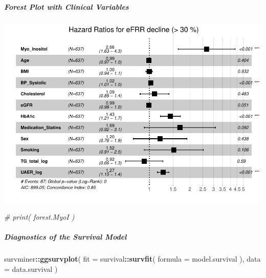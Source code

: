 \documentclass[]{article}
\newenvironment{Shaded}{\begin{snugshade}}{\end{snugshade}}
\newcommand{\CommentTok}[1]{\textcolor[rgb]{0.56,0.35,0.01}{\textit{#1}}}
\newcommand{\DataTypeTok}[1]{\textcolor[rgb]{0.13,0.29,0.53}{#1}}
\newcommand{\KeywordTok}[1]{\textcolor[rgb]{0.13,0.29,0.53}{\textbf{#1}}}
\newcommand{\NormalTok}[1]{#1}
\newcommand{\OperatorTok}[1]{\textcolor[rgb]{0.81,0.36,0.00}{\textbf{#1}}}
\newcommand{\StringTok}[1]{\textcolor[rgb]{0.31,0.60,0.02}{#1}}
\let\oldsubparagraph\subparagraph
\renewcommand{\subparagraph}[1]{\oldsubparagraph{#1}\mbox{}}
\begin{document}
\newpage

\hypertarget{forest-plot-with-clinical-variables-2}{%
\subparagraph{Forest Plot with Clinical
Variables}\label{forest-plot-with-clinical-variables-2}}

\begin{Shaded}
\end{Shaded}

\includegraphics{0033_PROFIL--Metabolomics_files/figure-latex/Myo-I-Mortality-Adjusted-Forest-1.pdf}

\begin{Shaded}
\begin{Highlighting}[]
\CommentTok{# print( forest.MyoI )}
\end{Highlighting}
\end{Shaded}

\newpage

\hypertarget{diagnostics-of-the-survival-model-2}{%
\subparagraph{Diagnostics of the Survival
Model}\label{diagnostics-of-the-survival-model-2}}

\begin{Shaded}
\begin{Highlighting}[]
\NormalTok{survminer}\OperatorTok{::}\KeywordTok{ggsurvplot}\NormalTok{(}
  \DataTypeTok{fit =}\NormalTok{ survival}\OperatorTok{::}\KeywordTok{survfit}\NormalTok{( }\DataTypeTok{formula =}\NormalTok{ model.survival ), }
  \DataTypeTok{data =}\NormalTok{ data.survival}
\NormalTok{)}
\end{Highlighting}
\end{Shaded}
\end{document}
